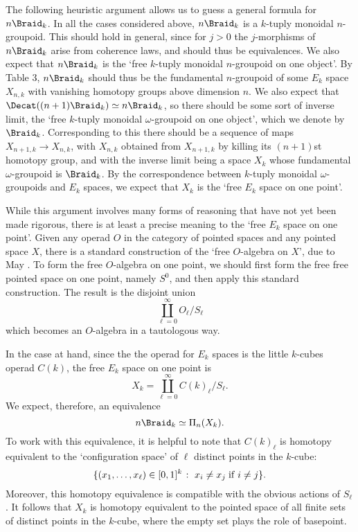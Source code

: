 The following heuristic argument allows us to guess a general formula
for $n\Braid_k$.  In all the cases considered above, $n\Braid_k$ is a
$k$-tuply monoidal $n$-groupoid.  This should hold in general, since for
$j > 0$ the $j$-morphisms of $n\Braid_k$ arise from coherence laws, and
should thus be equivalences.  We also expect that $n\Braid_k$ is the
`free $k$-tuply monoidal $n$-groupoid on one object'.  By Table 3,
$n\Braid_k$ should thus be the fundamental $n$-groupoid of some $E_k$
space $X_{n,k}$ with vanishing homotopy groups above dimension $n$.  We
also expect that $\Decat((n+1)\Braid_k) \simeq n\Braid_k$, so there
should be some sort of inverse limit, the `free $k$-tuply monoidal
$\omega$-groupoid on one object', which we denote by $\Braid_k$.
Corresponding to this there should be a sequence of maps $X_{n+1,k} \to
X_{n,k}$, with $X_{n,k}$ obtained from $X_{n+1,k}$ by killing its
$(n+1)$st homotopy group, and with the inverse limit being a space $X_k$
whose fundamental $\omega$-groupoid is $\Braid_k$.  By the
correspondence between $k$-tuply monoidal $\omega$-groupoids and $E_k$
spaces, we expect that $X_k$ is the `free $E_k$ space on one point'.

While this argument involves many forms of reasoning that have not yet
been made rigorous, there is at least a precise meaning to the `free
$E_k$ space on one point'.  Given any operad $O$ in the category
of pointed spaces and any pointed space $X$, there is a standard
construction of the `free $O$-algebra on $X$', due to May \cite{May2}.  
To form the free $O$-algebra on one point, we should first form the free
free pointed space on one point, namely $S^0$, and then apply
this standard construction.  The result is the disjoint union 
\[  \coprod_{\ell = 0}^\infty O_\ell /S_\ell \]
which becomes an $O$-algebra in a tautologous way.  

In the case at hand, since the the operad for $E_k$ spaces is the little
$k$-cubes operad $C(k)$, the free $E_k$ space on one point is
\[             X_k = \coprod_{\ell = 0}^\infty C(k)_\ell/S_\ell . \]
We expect, therefore, an equivalence
\[ n\Braid_k \simeq \Pi_n(X_k) . \]
To work with this equivalence, it is helpful to note that $C(k)_\ell$ is 
homotopy equivalent to the `configuration space' \cite{Segal} of $\ell$ 
distinct points in the $k$-cube:
\[      \{(x_1,\dots,x_\ell) \in [0,1]^k \;\colon \; x_i \ne x_j
{\rm \; if\;} i \ne j \}.      \] 
Moreover, this homotopy equivalence is compatible with the obvious
actions of $S_\ell$.  It follows that $X_k$ is homotopy equivalent to
the pointed space of all finite sets of distinct points in the $k$-cube,
where the empty set plays the role of basepoint.

